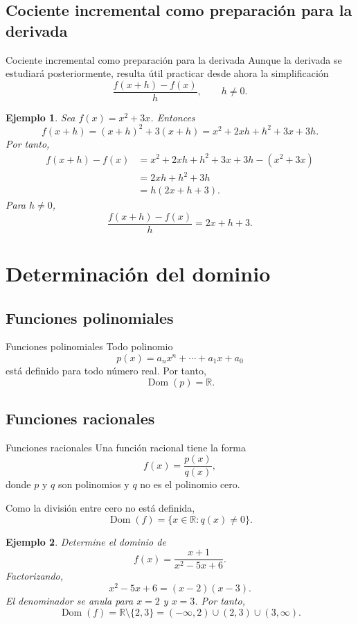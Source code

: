\documentclass[aspectratio=169,10pt]{beamer}
\newtheorem{ejemplo}{Ejemplo}
\newcommand{\R}{\mathbb{R}}
\newcommand{\Dom}{\operatorname{Dom}}
\begin{document}
\subsection{Cociente incremental como preparación para la derivada}
\begin{frame}{Cociente incremental como preparación para la derivada}
Aunque la derivada se estudiará posteriormente, resulta útil practicar desde
ahora la simplificación
\[
\frac{f(x+h)-f(x)}{h},\qquad h\neq0.
\]

\begin{ejemplo}
Sea $f(x)=x^2+3x$. Entonces
\[
f(x+h)=(x+h)^2+3(x+h)
=x^2+2xh+h^2+3x+3h.
\]
Por tanto,
\begin{align*}
f(x+h)-f(x)
&=x^2+2xh+h^2+3x+3h-(x^2+3x)\\
&=2xh+h^2+3h\\
&=h(2x+h+3).
\end{align*}
Para $h\neq0$,
\[
\frac{f(x+h)-f(x)}{h}=2x+h+3.
\]
\end{ejemplo}

\end{frame}
\section{Determinación del dominio}
\subsection{Funciones polinomiales}
\begin{frame}{Funciones polinomiales}
Todo polinomio
\[
p(x)=a_nx^n+\cdots+a_1x+a_0
\]
está definido para todo número real. Por tanto,
\[
\Dom(p)=\R.
\]
\end{frame}
\subsection{Funciones racionales}
\begin{frame}{Funciones racionales}
Una función racional tiene la forma
\[
f(x)=\frac{p(x)}{q(x)},
\]
donde $p$ y $q$ son polinomios y $q$ no es el polinomio cero.

Como la división entre cero no está definida,
\[
\Dom(f)=\{x\in\R:q(x)\neq0\}.
\]

\begin{ejemplo}
Determine el dominio de
\[
f(x)=\frac{x+1}{x^2-5x+6}.
\]
Factorizando,
\[
x^2-5x+6=(x-2)(x-3).
\]
El denominador se anula para $x=2$ y $x=3$. Por tanto,
\[
\Dom(f)=\R\setminus\{2,3\}
=(-\infty,2)\cup(2,3)\cup(3,\infty).
\]
\end{ejemplo}
\end{frame}
\end{document}
